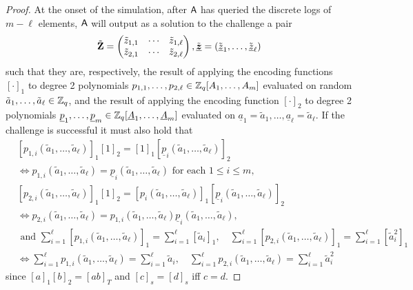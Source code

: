 \begin{proof}
At the onset of the simulation, after $\mathsf{A}$ has queried the discrete logs of $m-\ell$ elements, $\mathsf{A}$ will output as a solution to the challenge a pair
$$
\tilde{\mathbf{{Z}}}=\left(\begin{matrix}\tilde{z}_{1,1}&\cdots&\tilde{z}_{1,\ell}\\\tilde{z}_{2,1}&\cdots&\tilde{z}_{2,\ell}\end{matrix}\right),\tilde{\underline{{\boldsymbol{z}}}} = (\tilde{\underline{z}}_1,\ldots,\tilde{\underline{z}}_\ell)
$$
such that they are, respectively, the result of applying the encoding functions $[\cdot]_1$ to degree 2 polynomials $p_{1,1},\ldots,p_{2,\ell}\in\mathbb{Z}_q[A_{1},\ldots,\allowbreak A_{m}]$ evaluated on random $\tilde{a}_{1},\ldots,\tilde{a}_{\ell}\in\mathbb{Z}_q$, and the result of applying the encoding function $[\cdot]_2$ to  degree 2 polynomials $\underline{p}_{1},\ldots,\underline{p}_m\in\mathbb{Z}_q[\underline{A}_1,\ldots,\underline{A}_{m}]$ evaluated on $\underline{a}_{1} = \tilde{a}_{1},\ldots,\underline{a}_{\ell} = \tilde{a}_{\ell}$.
If the challenge is successful it must also hold that
\begin{align}
&[p_{1,i}(\tilde{a}_{1},\ldots,\tilde{a}_{\ell})]_1[1]_2 = [1]_1[\underline{p}_i(\tilde{a}_{1},\ldots,\tilde{a}_{\ell})]_2 \nonumber\\
& \Longleftrightarrow 
p_{1,i}(\tilde{a}_{1},\ldots,\tilde{a}_{\ell}) = \underline{p}_i(\tilde{a}_{1},\ldots,\tilde{a}_{\ell}) \text{ for each }1\leq i \leq m,
\label{eq:lin}\\
	&[p_{2,i}(\tilde{a}_{1},\ldots,\tilde{a}_{\ell})]_1[1]_2 = [p_{i}(\tilde{a}_{1},\ldots,\tilde{a}_{\ell})]_1[\underline{p}_i(\tilde{a}_{1},\ldots,\tilde{a}_{\ell})]_2 \nonumber\\
	& \Longleftrightarrow 
	p_{2,i}(\tilde{a}_{1},\ldots,\tilde{a}_{\ell}) = p_{1,i}(\tilde{a}_{1},\ldots,\tilde{a}_{\ell})\underline{p}_i(\tilde{a}_{1},\ldots,\tilde{a}_{\ell}),
	\label{eq:quad}\\
	&\text{ and }
	\sum_{i=1}^\ell [p_{1,i}(\tilde{a}_{1},\ldots,\tilde{a}_{\ell})]_1 = \sum_{i=1}^\ell [\tilde{a}_i]_1,\quad
	\sum_{i=1}^\ell [p_{2,i}(\tilde{a}_{1},\ldots,\tilde{a}_{\ell})]_1 = \sum_{i=1}^\ell [\tilde{a}^2_i]_1 \nonumber\\
	&\Longleftrightarrow
	\sum_{i=1}^\ell p_{1,i}(\tilde{a}_{1},\ldots,\tilde{a}_{\ell}) = \sum_{i=1}^\ell \tilde{a}_i,\quad
	\sum_{i=1}^\ell p_{2,i}(\tilde{a}_{1},\ldots,\tilde{a}_{\ell}) = \sum_{i=1}^\ell \tilde{a}^2_i
	\label{eq:sum}
\end{align}
since $[a]_1[b]_2 = [ab]_T$ and $[c]_s =[d]_s$ iff $c=d$.


\end{proof}
